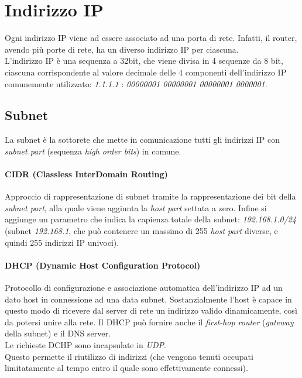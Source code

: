 \section{Indirizzo IP}
Ogni indirizzo IP viene ad essere associato ad una porta di rete. Infatti, il router, avendo più porte di rete, ha un diverso indirizzo IP per ciascuna. \\
L'indirizzo IP è una sequenza a 32bit, che viene divisa in 4 sequenze da 8 bit, ciascuna corrispondente al valore decimale delle 4 componenti dell'indirizzo IP comunemente utilizzato: \textit{1.1.1.1} : \textit{00000001 00000001 00000001 0000001}.

\subsection{Subnet}
La subnet è la sottorete che mette in comunicazione tutti gli indirizzi IP con \textit{subnet part} (sequenza \textit{high order bits}) in comune.
\paragraph{CIDR (Classless InterDomain Routing)}
Approccio di rappresentazione di subnet tramite la rappresentazione dei bit della \textit{subnet part}, alla quale viene aggiunta la \textit{host part} settata a zero. Infine si aggiunge un parametro che indica la capienza totale della subnet: \textit{192.168.1.0/24} (subnet \textit{192.168.1}, che può contenere un massimo di 255 \textit{host part} diverse, e quindi 255 indirizzi IP univoci). \hfill \\
\paragraph{DHCP (Dynamic Host Configuration Protocol)}
Protocollo di configurazione e associazione automatica dell'indirizzo IP ad un dato host in connessione ad una data subnet.
Sostanzialmente l'host è capace in questo modo di ricevere dal server di rete un indirizzo valido dinamicamente, così da potersi unire alla rete.
Il DHCP può fornire anche il \textit{first-hop router} (\textit{gateway} della subnet) e il DNS server. \\
Le richieste DCHP sono incapsulate in \textit{UDP}. \\
Questo permette il riutilizzo di indirizzi (che vengono tenuti occupati limitatamente al tempo entro il quale sono effettivamente connessi).

